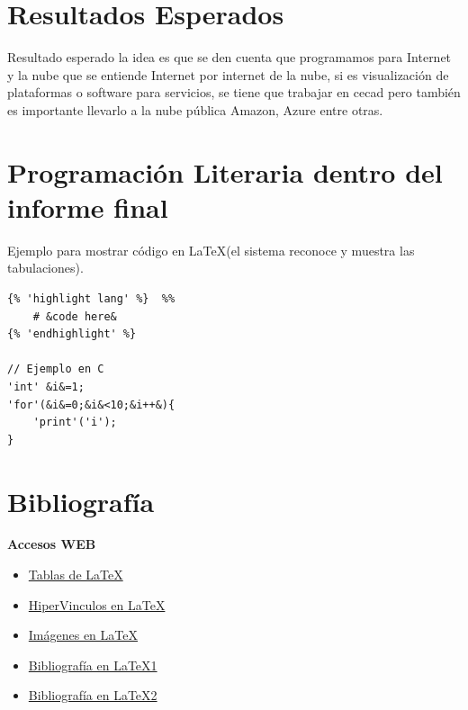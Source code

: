\documentclass[10pt]{article}   			%
\begin{document}
\section{Resultados Esperados}

Resultado esperado la idea es que se den cuenta que programamos para Internet y la nube que se entiende Internet por internet de la nube, si es visualización de  plataformas o software para servicios, se tiene que trabajar en cecad pero también es importante llevarlo a la nube pública Amazon, Azure entre otras.
		
\section{Programación Literaria dentro del informe final}

Ejemplo para mostrar código en \LaTeX(el sistema reconoce y muestra las tabulaciones).
\begin{small}
\begin{lstlisting}[frame=single,style=base]	
{% 'highlight lang' %}  %%
	# &code here&
{% 'endhighlight' %}

// Ejemplo en C
'int' &i&=1;
'for'(&i&=0;&i&<10;&i++&){
	'print'('i');
}
\end{lstlisting}
\end{small}
		
\section{Bibliografía}	
\textbf{{\Large Accesos WEB}}
\begin{itemize}
	\item \href{http://texblog.org/2012/12/21/multi-column-and-multi-row-cells-in-latex-tables/}{Tablas de \LaTeX}
	\item \href{https://en.wikibooks.org/wiki/LaTeX/Hyperlinks}{HiperVinculos en \LaTeX}
	\item \href{https://es.sharelatex.com/learn/Inserting_Images}{Imágenes en \LaTeX}
	\item \href{http://logistica.fime.uanl.mx/miguel/docs/BibTeX.pdf}{Bibliografía en \LaTeX 1}
	\item \href{http://minisconlatex.blogspot.com.co/2011/03/bibliografia.html}{Bibliografía en \LaTeX 2}
\end{itemize}

\nocite{*}
\end{document}
